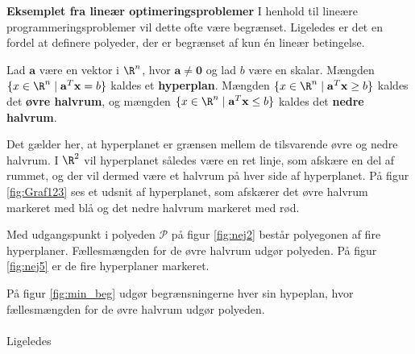 \noindent
% 
\textbf{Eksemplet fra lineær optimeringsproblemer}
%
%
I henhold til lineære programmeringsproblemer vil dette ofte være begrænset.
Ligeledes er det en fordel at definere polyeder, der er begrænset af kun én lineær betingelse. 
%
\begin{defn}{}{}
Lad $\mathbf{a}$ være en vektor i $\R^n$, hvor $\mathbf{a} \neq \mathbf{0}$ og lad $b$ være en skalar.
Mængden $\{x \in \R^n \mid \mathbf{a}^T \mathbf{x}=b\}$ kaldes et \textbf{hyperplan}.
%
Mængden $\{x \in \R^n \mid \mathbf{a}^T \mathbf{x} \geq b\}$ kaldes det \textbf{øvre halvrum}, og
mængden $\{x \in \R^n \mid \mathbf{a}^T \mathbf{x} \leq b\}$ kaldes det \textbf{nedre halvrum}.
\end{defn}
\noindent
%
Det gælder her, at hyperplanet er grænsen mellem de tilsvarende øvre og nedre halvrum.
I $\R^2$ vil hyperplanet således være en ret linje, som afskære en del af rummet, og der vil dermed være et halvrum på hver side af hyperplanet.
På figur \ref{fig:Graf123} ses et udsnit af hyperplanet, som afskærer det øvre halvrum markeret med blå og det nedre halvrum markeret med rød. 


%
Med udgangspunkt i polyeden $\mathcal{P}$ på figur \ref{fig:nej2} består polyegonen af fire hyperplaner. 
Fællesmængden for de øvre halvrum udgør polyeden.
På figur \ref{fig:nej5} er de fire hyperplaner markeret. 
%
%

%
På figur \ref{fig:min_beg} udgør begrænsningerne hver sin hypeplan, hvor fællesmængden for de øvre halvrum udgør polyeden.
\\\\
% 
Ligeledes 

